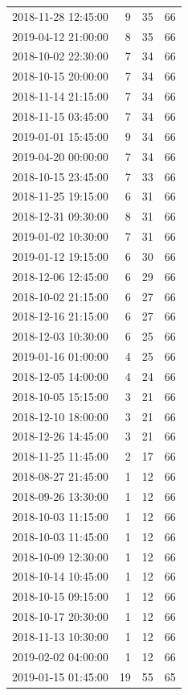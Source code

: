 \begin{tabular}{lrrr}
2018-11-28 12:45:00 & 9 & 35 & 66 \\
2019-04-12 21:00:00 & 8 & 35 & 66 \\
2018-10-02 22:30:00 & 7 & 34 & 66 \\
2018-10-15 20:00:00 & 7 & 34 & 66 \\
2018-11-14 21:15:00 & 7 & 34 & 66 \\
2018-11-15 03:45:00 & 7 & 34 & 66 \\
2019-01-01 15:45:00 & 9 & 34 & 66 \\
2019-04-20 00:00:00 & 7 & 34 & 66 \\
2018-10-15 23:45:00 & 7 & 33 & 66 \\
2018-11-25 19:15:00 & 6 & 31 & 66 \\
2018-12-31 09:30:00 & 8 & 31 & 66 \\
2019-01-02 10:30:00 & 7 & 31 & 66 \\
2019-01-12 19:15:00 & 6 & 30 & 66 \\
2018-12-06 12:45:00 & 6 & 29 & 66 \\
2018-10-02 21:15:00 & 6 & 27 & 66 \\
2018-12-16 21:15:00 & 6 & 27 & 66 \\
2018-12-03 10:30:00 & 6 & 25 & 66 \\
2019-01-16 01:00:00 & 4 & 25 & 66 \\
2018-12-05 14:00:00 & 4 & 24 & 66 \\
2018-10-05 15:15:00 & 3 & 21 & 66 \\
2018-12-10 18:00:00 & 3 & 21 & 66 \\
2018-12-26 14:45:00 & 3 & 21 & 66 \\
2018-11-25 11:45:00 & 2 & 17 & 66 \\
2018-08-27 21:45:00 & 1 & 12 & 66 \\
2018-09-26 13:30:00 & 1 & 12 & 66 \\
2018-10-03 11:15:00 & 1 & 12 & 66 \\
2018-10-03 11:45:00 & 1 & 12 & 66 \\
2018-10-09 12:30:00 & 1 & 12 & 66 \\
2018-10-14 10:45:00 & 1 & 12 & 66 \\
2018-10-15 09:15:00 & 1 & 12 & 66 \\
2018-10-17 20:30:00 & 1 & 12 & 66 \\
2018-11-13 10:30:00 & 1 & 12 & 66 \\
2019-02-02 04:00:00 & 1 & 12 & 66 \\
2019-01-15 01:45:00 & 19 & 55 & 65 \\

\end{tabular}
